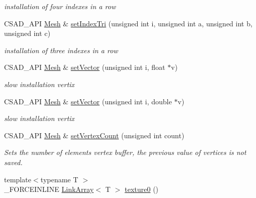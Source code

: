 \begin{DoxyCompactItemize}
\begin{DoxyCompactList}\small\item\em installation of four indexes in a row \end{DoxyCompactList}\item 
\hypertarget{classcsad_1_1_mesh_add0ee563d6adea5c387f8ac66e03a38b}{C\-S\-A\-D\-\_\-\-A\-P\-I \hyperlink{classcsad_1_1_mesh}{Mesh} \& \hyperlink{classcsad_1_1_mesh_add0ee563d6adea5c387f8ac66e03a38b}{set\-Index\-Tri} (unsigned int i, unsigned int a, unsigned int b, unsigned int c)}\label{classcsad_1_1_mesh_add0ee563d6adea5c387f8ac66e03a38b}

\begin{DoxyCompactList}\small\item\em installation of three indexes in a row \end{DoxyCompactList}\item 
\hypertarget{classcsad_1_1_mesh_a698ca8b4ed067aeffe7fc51ae7fc580d}{C\-S\-A\-D\-\_\-\-A\-P\-I \hyperlink{classcsad_1_1_mesh}{Mesh} \& \hyperlink{classcsad_1_1_mesh_a698ca8b4ed067aeffe7fc51ae7fc580d}{set\-Vector} (unsigned int i, float $\ast$v)}\label{classcsad_1_1_mesh_a698ca8b4ed067aeffe7fc51ae7fc580d}

\begin{DoxyCompactList}\small\item\em slow installation vertix \end{DoxyCompactList}\item 
\hypertarget{classcsad_1_1_mesh_a7a523d5df0fb192fd5f8f88b3522a7d7}{C\-S\-A\-D\-\_\-\-A\-P\-I \hyperlink{classcsad_1_1_mesh}{Mesh} \& \hyperlink{classcsad_1_1_mesh_a7a523d5df0fb192fd5f8f88b3522a7d7}{set\-Vector} (unsigned int i, double $\ast$v)}\label{classcsad_1_1_mesh_a7a523d5df0fb192fd5f8f88b3522a7d7}

\begin{DoxyCompactList}\small\item\em slow installation vertix \end{DoxyCompactList}\item 
\hypertarget{classcsad_1_1_mesh_a7204425ae77e50f52a019acb8c566e8f}{C\-S\-A\-D\-\_\-\-A\-P\-I \hyperlink{classcsad_1_1_mesh}{Mesh} \& \hyperlink{classcsad_1_1_mesh_a7204425ae77e50f52a019acb8c566e8f}{set\-Vertex\-Count} (unsigned int count)}\label{classcsad_1_1_mesh_a7204425ae77e50f52a019acb8c566e8f}

\begin{DoxyCompactList}\small\item\em Sets the number of elements vertex buffer, the previous value of vertices is not saved. \end{DoxyCompactList}\item 
\hypertarget{classcsad_1_1_mesh_a2225a16afadd8f40884ca478a90046f8}{{\footnotesize template$<$typename T $>$ }\\\-\_\-\-F\-O\-R\-C\-E\-I\-N\-L\-I\-N\-E \hyperlink{classbt_1_1_link_array}{Link\-Array}$<$ T $>$ \hyperlink{classcsad_1_1_mesh_a2225a16afadd8f40884ca478a90046f8}{texture0} ()}\label{classcsad_1_1_mesh_a2225a16afadd8f40884ca478a90046f8}


\end{DoxyCompactItemize}
